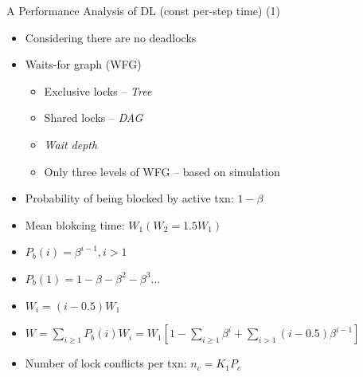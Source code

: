 \documentclass[sans]{beamer}
\begin{document}
\begin{frame}{A Performance Analysis of DL (const per-step time) (1)}
  \begin{itemize}
    \item Considering there are no deadlocks
    \item Waits-for graph (WFG)
    \begin{itemize}
      \item Exclusive locks -- \emph{Tree}
      \item Shared locks -- \emph{DAG}
      \item \emph{Wait depth}
      \item Only three levels of WFG -- based on simulation
    \end{itemize}
    \item Probability of being blocked by active txn: $1 - \beta$ 
    \item Mean blokcing time: $W_1 (W_2 = 1.5W_1)$
    \item $P_b(i) = \beta^{i - 1}, i > 1$
    \item $P_b(1) = 1 - \beta - \beta^2 - \beta^3 ...$
    \item $W_i = (i - 0.5)W_1$
    \item $W = \sum_{i \ge 1}P_b(i)W_i = W_1[1 - \sum_{i \ge 1} \beta^i +
      \sum_{i > 1}(i - 0.5)\beta^{i - 1}]$
    \item Number of lock conflicts per txn: $n_c = K_1P_c$
  \end{itemize}
\end{frame}
\end{document}
